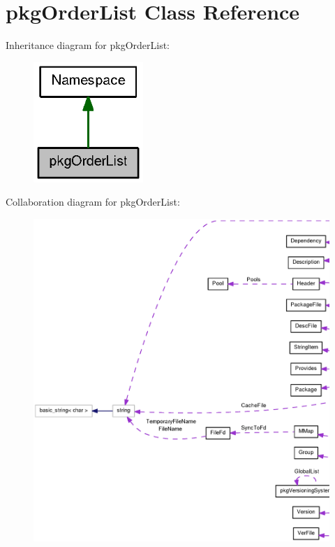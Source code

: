\section{pkg\-Order\-List \-Class \-Reference}
\label{classpkgOrderList}


\-Inheritance diagram for pkg\-Order\-List\-:
\nopagebreak
\begin{figure}[H]
\begin{center}
\leavevmode
\includegraphics[width=118pt]{classpkgOrderList__inherit__graph}
\end{center}
\end{figure}


\-Collaboration diagram for pkg\-Order\-List\-:
\nopagebreak
\begin{figure}[H]
\begin{center}
\leavevmode
\includegraphics[width=350pt]{classpkgOrderList__coll__graph}
\end{center}
\end{figure}
